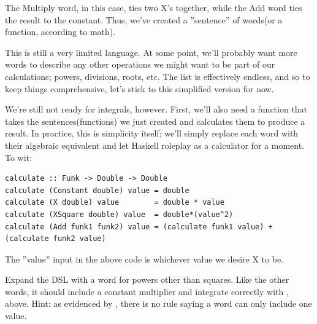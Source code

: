 The Multiply word, in this case, ties two X's together, while the Add word ties the result to the constant. Thus, we've created a ''sentence'' of words(or a function, according to math).

This is still a very limited language. At some point, we'll probably want more words to describe any other operations we might want to be part of our calculations; powers, divisions, roots, etc. The list is effectively endless, and so to keep things comprehensive, let's stick to this simplified version for now.
\fi

We're still not ready for integrals, however. First, we'll also need a function that takes the sentences(functions) we just created and calculates them to produce a result. In practice, this is simplicity itself; we'll simply replace each word with their algebraic equivalent and let Haskell roleplay as a calculator for a moment. To wit:
\begin{verbatim}
calculate :: Funk -> Double -> Double
calculate (Constant double) value = double
calculate (X double) value        = double * value
calculate (XSquare double) value  = double*(value^2)
calculate (Add funk1 funk2) value = (calculate funk1 value) + (calculate funk2 value)
\end{verbatim}

The ''value'' input in the above code is whichever value we desire X to be.

\begin{exercise}
Expand the DSL with a word for powers other than squares. Like the other words, it should include a constant multiplier and integrate correctly with , above. Hint: as evidenced by , there is no rule saying a word can only include one value.
\end{exercise}

